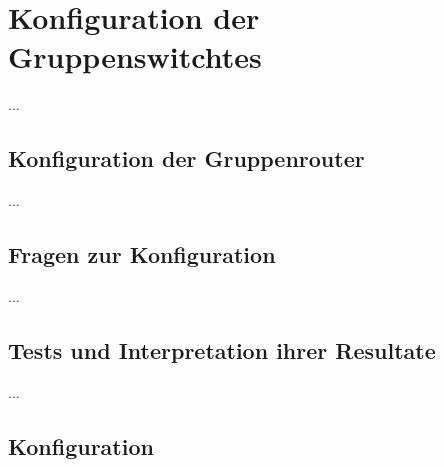 \documentclass{article.cls}
\begin{document}
    \section{Konfiguration der Gruppenswitchtes}

    ...

    \subsection{Konfiguration der Gruppenrouter}

    ...

    \subsection{Fragen zur Konfiguration}

    ...

    \subsection{Tests und Interpretation ihrer Resultate}

    ...

    \subsection{Konfiguration}
\end{document}
